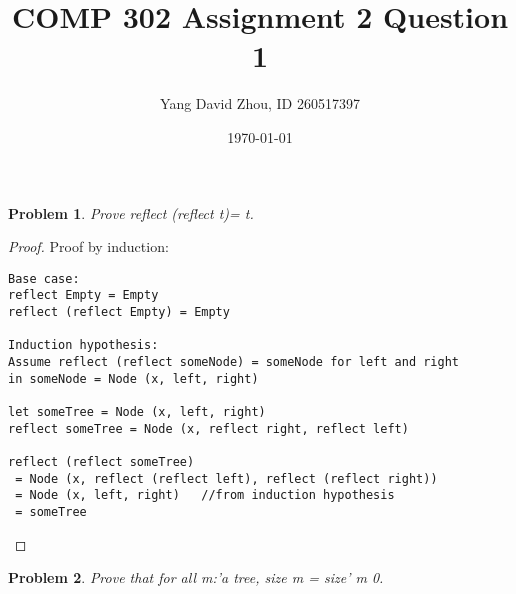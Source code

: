 \documentclass{article}
\newtheorem{problem}{Problem}
\theoremstyle{definition}
\begin{document}
 \title{COMP 302 Assignment 2 Question 1} 

\author{Yang David Zhou, ID 260517397} 

\date{\today}

\maketitle

\begin{problem} 

Prove reflect (reflect t)= t.

\end{problem}

\begin{proof}

Proof by induction: 

\begin{verbatim}
Base case: 
reflect Empty = Empty
reflect (reflect Empty) = Empty

Induction hypothesis:
Assume reflect (reflect someNode) = someNode for left and right
in someNode = Node (x, left, right)

let someTree = Node (x, left, right)
reflect someTree = Node (x, reflect right, reflect left)

reflect (reflect someTree) 
 = Node (x, reflect (reflect left), reflect (reflect right))
 = Node (x, left, right)   //from induction hypothesis
 = someTree
\end{verbatim}

\end{proof}

\begin{problem}

Prove that for all m:'a tree, size m = size' m 0.

\end{problem}
\end{document}

